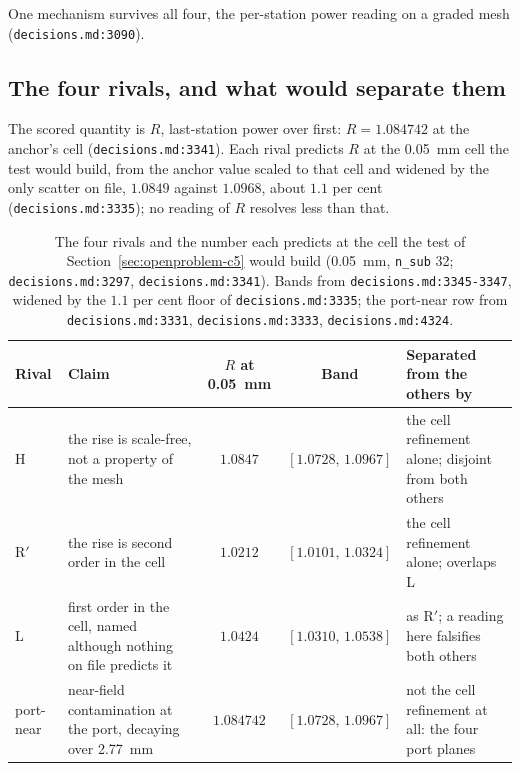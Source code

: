 One mechanism survives all four, the per-station power reading on a graded mesh (\texttt{decisions.md:3090}).

\subsection{The four rivals, and what would separate them}
\label{sec:openproblem-rivals}

The scored quantity is $R$, last-station power over first: $R = 1.084742$ at the anchor's cell
(\texttt{decisions.md:3341}). Each rival predicts $R$ at the \SI{0.05}{mm} cell the test would build, from the
anchor value scaled to that cell and widened by the only scatter on file, $1.0849$ against $1.0968$, about $1.1$
per cent (\texttt{decisions.md:3335}); no reading of $R$ resolves less than that.

\begin{table}[H]
  \centering
  \caption{The four rivals and the number each predicts at the cell the test of Section~\ref{sec:openproblem-c5}
  would build (\SI{0.05}{mm}, \texttt{n\_sub} 32; \texttt{decisions.md:3297}, \texttt{decisions.md:3341}). Bands
  from \texttt{decisions.md:3345-3347}, widened by the $1.1$ per cent floor of \texttt{decisions.md:3335}; the
  port-near row from \texttt{decisions.md:3331}, \texttt{decisions.md:3333}, \texttt{decisions.md:4324}.}
  \label{tab:openproblem-rivals}
  \begin{tabular}{@{}lp{3.6cm}cc p{4.5cm}@{}}
    \toprule
    Rival & Claim & $R$ at \SI{0.05}{mm} & Band & Separated from the others by \\
    \midrule
    H & the rise is scale-free, not a property of the mesh & $1.0847$ & $[1.0728,\,1.0967]$
      & the cell refinement alone; disjoint from both others \\
    \addlinespace
    R$'$ & the rise is second order in the cell & $1.0212$ & $[1.0101,\,1.0324]$
      & the cell refinement alone; overlaps L \\
    \addlinespace
    L & first order in the cell, named although nothing on file predicts it & $1.0424$
      & $[1.0310,\,1.0538]$ & as R$'$; a reading here falsifies both others \\
    \addlinespace
    port-near & near-field contamination at the port, decaying over \SI{2.77}{mm} & $1.084742$
      & $[1.0728,\,1.0967]$ & not the cell refinement at all: the four port planes \\
    \bottomrule
  \end{tabular}
\end{table}

